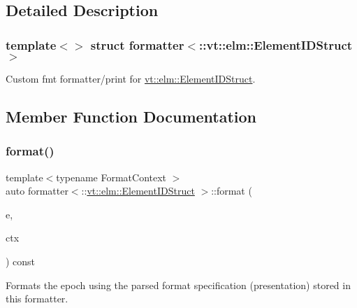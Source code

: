 \subsection{Detailed Description}
\subsubsection*{template$<$$>$\newline
struct formatter$<$\+::vt\+::elm\+::\+Element\+I\+D\+Struct $>$}

Custom fmt formatter/print for {\ttfamily \hyperlink{structvt_1_1elm_1_1_element_i_d_struct}{vt\+::elm\+::\+Element\+I\+D\+Struct}}. 

\subsection{Member Function Documentation}
\mbox{\label{structformatter_3_1_1vt_1_1elm_1_1_element_i_d_struct_01_4_af1476f1e35efbd42e918307011d73905}} 
\subsubsection{\texorpdfstring{format()}{format()}}
{\footnotesize\ttfamily template$<$typename Format\+Context $>$ \\
auto formatter$<$\+::\hyperlink{structvt_1_1elm_1_1_element_i_d_struct}{vt\+::elm\+::\+Element\+I\+D\+Struct} $>$\+::format (\begin{DoxyParamCaption}\item[{\+::\hyperlink{structvt_1_1elm_1_1_element_i_d_struct}{vt\+::elm\+::\+Element\+I\+D\+Struct} const \&}]{e,  }\item[{Format\+Context \&}]{ctx }\end{DoxyParamCaption}) const\hspace{0.3cm}{\ttfamily [inline]}}

Formats the epoch using the parsed format specification (presentation) stored in this formatter. \mbox{\label{structformatter_3_1_1vt_1_1elm_1_1_element_i_d_struct_01_4_af609a6eb500b642c471f5687b14432a2}} 
